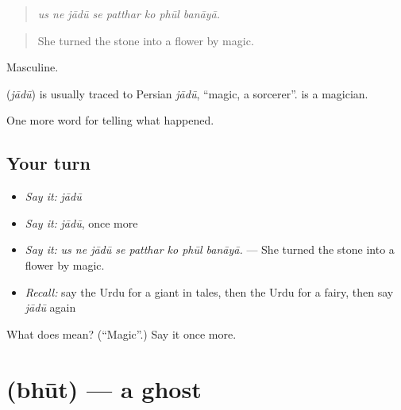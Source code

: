 \begin{quote}
       
\end{quote}

\begin{quote}
\emph{us ne jādū se patthar ko phūl banāyā.}
\end{quote}

\begin{quote}
She turned the stone into a flower by magic.
\end{quote}

Masculine.

\begin{cousinweb}
\textbf{} (\emph{jādū}) is usually traced to Persian \emph{jādū}, \textquotedblleft{}magic, a sorcerer\textquotedblright{}. \textbf{} is a magician.
\end{cousinweb}

\begin{grammarlens}[title={What you've built}]
One more word for telling what happened.
\end{grammarlens}

\subsection*{Your turn}
\begin{itemize}
\raggedright
  \item \emph{Say it:} \emph{jādū}
  \item \emph{Say it:} \emph{jādū}, once more
  \item \emph{Say it:} \emph{us ne jādū se patthar ko phūl banāyā.} — She turned the stone into a flower by magic.
  \item \emph{Recall:} say the Urdu for a giant in tales, then the Urdu for a fairy, then say \emph{jādū} again
\end{itemize}

\begin{tcolorbox}[breakable,colback=teal!4,colframe=teal!35!black,title={Before you move on}]
What does  mean? (\textquotedblleft{}Magic\textquotedblright{}.) Say it once more.
\end{tcolorbox}
\section[\texorpdfstring{\ur{بھوت} (bhūt)}{بھوت (bhūt)}]{ (bhūt) — a ghost}

\label{lesson:UR-C325-bhut}



